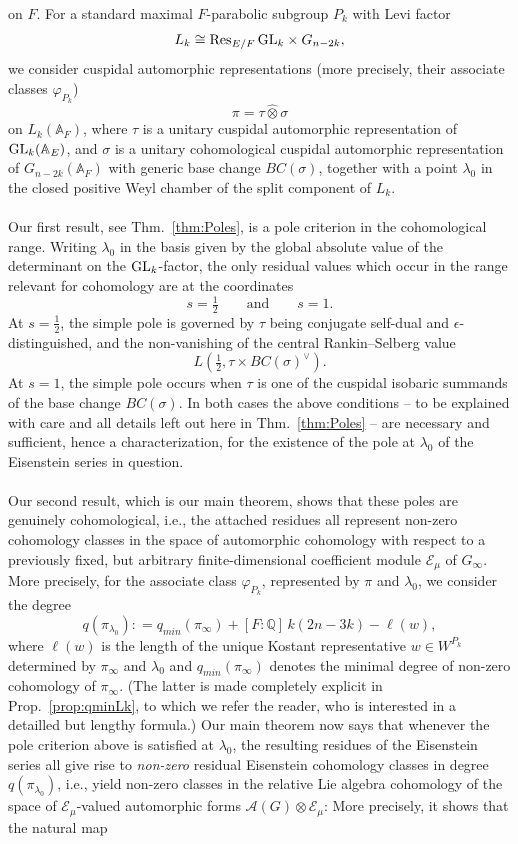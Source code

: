 \documentclass[a4paper,10pt]{amsart}
\theoremstyle{definition}
\numberwithin{equation}{section}
\def\EE{\mathcal E}
\def\GL{{\rm GL}}
\begin{document}
on \(F\). For a standard maximal \(F\)-parabolic subgroup \(P_k\) with
Levi factor
$$
        L_k\cong \operatorname{Res}_{E/F}\GL_k\times G_{n-2k},
$$
we consider cuspidal automorphic representations (more precisely, their associate classes $\varphi_{P_k}$)
$$
        \pi=\tau\widehat\otimes\sigma
$$
on \(L_k(\mathbb A_F)\), where \(\tau\) is a unitary cuspidal automorphic
representation of \(\GL_k(\mathbb A_E)\), and \(\sigma\) is a unitary
cohomological cuspidal automorphic representation of
\(G_{n-2k}(\mathbb A_F)\) with generic base change $BC(\sigma)$, together with a point $\lambda_0$ in the closed positive Weyl chamber of the split component of $L_k$. 
\\\\
Our first result, see Thm.\ \ref{thm:Poles}, is a pole criterion in the cohomological range. Writing $\lambda_0$ in the basis given by the global absolute value of the determinant on the $\GL_k$-factor, the only residual values which occur in the range relevant for cohomology are at the coordinates
$$
        s=\tfrac12
        \qquad\text{and}\qquad
        s=1 .
$$
At \(s=\frac12\), the simple pole is governed by $\tau$ being conjugate self-dual and \(\epsilon\)-distinguished, and the non-vanishing of the central
Rankin--Selberg value
$$
        L\!\left(\tfrac12,\tau\times BC(\sigma)^\vee\right).
$$
At \(s=1\), the simple pole occurs when \(\tau\) is one of the
cuspidal isobaric summands of the base change \(BC(\sigma)\). In both cases the above conditions -- to be explained with care and all details left out here in Thm.\ \ref{thm:Poles} -- are necessary and sufficient, hence a characterization, for the existence of the pole at $\lambda_0$ of the Eisenstein series in question.\\\\
Our second result, which is our main theorem, shows that these poles are genuinely cohomological, i.e., the attached residues all represent non-zero cohomology classes in the space of automorphic cohomology with respect to a previously fixed, but arbitrary finite-dimensional coefficient module $\EE_\mu$ of $G_\infty$. More precisely, for the associate class $\varphi_{P_k}$, represented by $\pi$ and $\lambda_0$, we consider the degree
$$
        q(\pi_{\lambda_0}):
        =
        q_{min}(\pi_\infty)
        +[F:\mathbb Q]\,k(2n-3k)-\ell(w),
$$
where $\ell(w)$ is the length of the unique Kostant representative \(w\in W^{P_k}\) determined by $\pi_\infty$ and $\lambda_0$ and $q_{min}(\pi_\infty)$ denotes the minimal degree of non-zero cohomology of $\pi_\infty$. (The latter is made completely explicit in Prop.\ \ref{prop:qminLk}, to which we refer the reader, who is interested in a detailled but lengthy formula.) Our main theorem now says that whenever the pole criterion above is satisfied at \(\lambda_0\), the resulting residues of the Eisenstein series all give rise to {\it non-zero} residual Eisenstein cohomology classes in degree \(q(\pi_{\lambda_0})\), i.e., yield non-zero classes in the relative Lie algebra cohomology of the space of $\EE_\mu$-valued automorphic forms $\mathcal A(G)\otimes\EE_\mu$: More precisely, it shows that the natural map 
\end{document}
